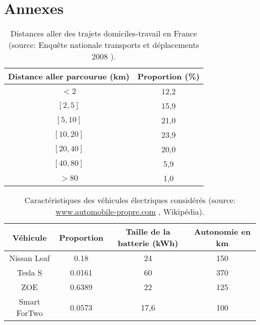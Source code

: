 
\tocless\section{Annexes}

\setcounter{table}{0} \renewcommand{\thetable}{A.\arabic{table}} 

\begin{table}[h]
\centering
\begin{tabular}{|c|c|}	
\hline
\textbf{Distance aller parcourue (\si{km})} & \textbf{Proportion (\%{})} \\
\hline
$<2$ & 12,2 \\
$[2,5]$ & 15,9 \\
$[5,10]$ & 21,0 \\
$[10,20]$ & 23,9 \\
$[20,40]$ & 20,0 \\
$[40,80]$ & 5,9 \\
$>80$ & 1,0 \\
\hline
\end{tabular}
\caption{Distances aller des trajets domiciles-travail en France (source: Enquête nationale transports et déplacements 2008 \cite{enqueteGouv}). \label{distance}}
\end{table}

\begin{table}[h]
\centering
\begin{tabular}{|c||c|c|c|}
\hline
\textbf{Véhicule} & \textbf{Proportion} & \textbf{Taille de la batterie (kWh)} & \textbf{Autonomie en km} \\
\hline
Nissan Leaf  &  0.18   &  24  &  150 \\
Tesla S & 0.0161  & 60 & 370 \\
ZOE & 0.6389  & 22 & 125 \\
Smart ForTwo & 0.0573  & 17,6 & 100 \\
\hline
\end{tabular}
\caption{Caractéristiques des véhicules électriques considérés (source: \url{www.automobile-propre.com} \cite{donneesVehicule}, Wikipédia).\label{carVE}}
\end{table}

